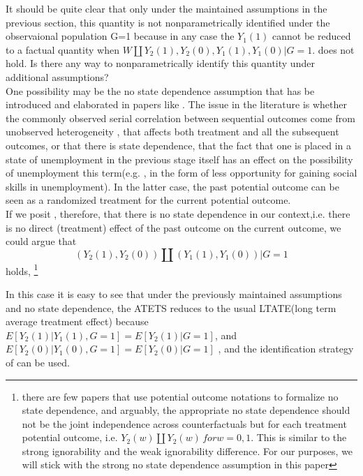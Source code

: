 \documentclass{article}
\begin{document}
It should be quite clear that only under the maintained assumptions in the previous section, this quantity is not nonparametrically identified under the observaional population G=1 because in any case the  $Y_1(1)$ cannot be reduced to a factual quantity when $ W \amalg Y_2(1) ,Y_2(0), Y_1(1), Y_1(0) |G=1$. does not hold.
Is there any way to nonparametrically identify this quantity under additional assumptions?\\
One possibility may be the no state dependence assumption that has be introduced and elaborated in papers like \cite{heckman1981heterogeneity,heckman1984method,torgovitsky2019nonparametric}. The issue in the literature is whether the commonly observed serial correlation between sequential outcomes come from unobserved heterogeneity , that affects both treatment and all the subsequent outcomes, or that there is state dependence, that the fact that one is placed in a state of unemployment in the previous stage itself has an effect on the possibility of unemployment this term(e.g. , in the form of less opportunity for gaining social skills in unemployment). In the latter case, the past potential outcome can be seen as a randomized treatment for the current potential outcome. \\
If we posit , therefore, that there is no state dependence in our context,i.e. there is no direct (treatment) effect of the past outcome on the current outcome, we could argue that 
\begin{equation}
    (Y_2(1), Y_2(0) ) \amalg (Y_1(1) , Y_1(0) ) | G=1 
\end{equation}
holds, \footnote{  there are few papers that use potential outcome notations to formalize no state dependence, and arguably, the appropriate no state dependence should not be the joint independence across counterfactuals but for each treatment potential outcome, i.e. $ Y_2(w) \amalg Y_2(w) \, for w= 0,1 $. This is similar to the strong ignorability \cite{rosenbaum1983central} and the weak ignorability \cite{imbens2015causal} difference. For our purposes, we will stick with the strong no state dependence assumption in this paper }   

In this case it is easy to see that under the previously maintained assumptions and no state dependence, the ATETS reduces to the usual LTATE(long term average treatment effect) because $E[ Y_2(1) | Y_1(1), G=1 ] = E[ Y_2(1) | G=1] $, and $ E[Y_2(0) | Y_1(0) , G=1] =  E[Y_2(0) |  G=1]$   , and the identification strategy of \cite{athey2020combining} can be used. 
\end{document}
